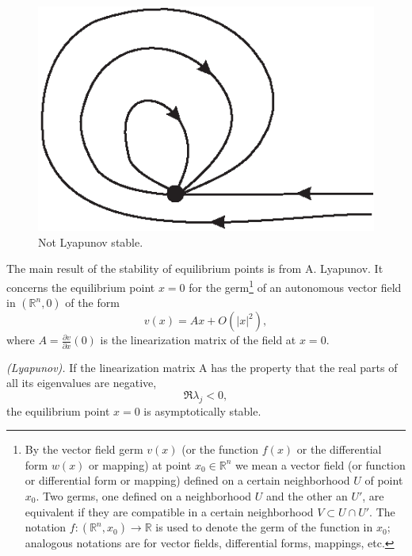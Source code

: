 \begin{figure}[!ht]
	\centering
	\includegraphics [scale=1.5]{jtr12}
	\caption{Not Lyapunov stable.}
	\label{fig:1.2}
\end{figure}

The main result of the stability of equilibrium points is from A. Lyapunov. It concerns the equilibrium point $x = 0$ for the germ\footnote{By the vector field germ $v (x)$ (or the function $f (x)$ or the differential form $w(x)$ or mapping) at point $x_0\in \mathbb{R}^n$ we mean a vector field (or function or differential form or mapping) defined on a certain neighborhood $U$ of point $x_0$. Two germs, one defined on a neighborhood $U$ and the other an $U'$, are equivalent if they are compatible in a certain neighborhood $V \subset U \cap U'$. The notation $f: (\mathbb{R}^n, x_0)\to \mathbb{R}$ is used to denote the germ of the function in $x_0$; analogous notations are for vector fields, differential forms, mappings, etc.} of an autonomous vector field in $(\mathbb{R}^n, 0)$ of the form
\begin{equation}\label{1.3}
	v(x) = Ax + O(\left|x\right|^2),
\end{equation}
where $A = \frac{\partial v}{\partial x}(0)$ is the linearization matrix of the field at $x = 0$.

\begin{theorem}\label{theo:1.4}
	\emph{(Lyapunov).}
	If the linearization matrix A has the property that the real parts of all its eigenvalues are negative,
	\begin{equation}\label{eq:Lyapunov}
		\Re \lambda_j <0,
	\end{equation}
	the equilibrium point $x = 0$ is asymptotically stable.
\end{theorem}

